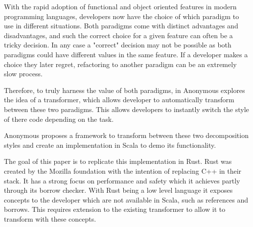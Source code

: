 \documentclass[ oneside,%
                    author={James Elgar},
                    degree={MEng},
                     title={Bidirectional transformer between functional and \\ object-oriented programming in Rust},
                  subtitle={}]{dissertation}
\newcommand{\weixin}{Anonymous }
\begin{document}



\noindent
With the rapid adoption of functional and object oriented features in modern programming languages, developers now have the choice of which paradigm to use in different situations. Both paradigms come with distinct advantages and disadvantages, and such the correct choice for a given feature can often be a tricky decision. In any case a "correct" decision may not be possible as both paradigms could have different values in the same feature. If a developer makes a choice they later regret, refactoring to another paradigm can be an extremely slow process.

Therefore, to truly harness the value of both paradigms, in \cite{food} \weixin explores the idea of a transformer, which allows developer to automatically transform between these two paradigms. This allows developers to instantly switch the style of there code depending on the task.

\weixin proposes a framework to transform between these two decomposition styles and create an implementation in Scala to demo its functionality.

The goal of this paper is to replicate this implementation in Rust. Rust was created by the Mozilla foundation with the intention of replacing C++ in their stack. It has a strong focus on performance and safety which it achieves partly through its borrow checker. With Rust being a low level language it exposes concepts to the developer which are not available in Scala, such as references and borrows. This requires extension to the existing transformer to allow it to transform with these concepts. 
\end{document}
